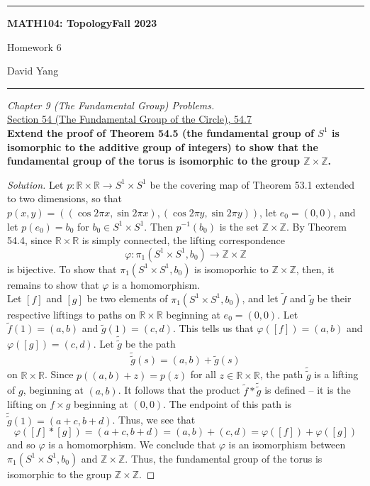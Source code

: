 \documentclass[11pt]{article}
\newcommand{\R}{\mathbb{R}}
\newcommand{\Z}{\mathbb{Z}}
\newenvironment{solution}
  {\renewcommand\qedsymbol{$\blacksquare$}\begin{proof}[Solution]}
  {\end{proof}}
\begin{document}
	\hrule
	\begin{center}
        \textbf{MATH104: Topology}\hfill \textbf{Fall 2023}\newline

		{\Large Homework 6}

		David Yang
	\end{center}

\hrule

\vspace{1em}

\textit{Chapter 9 (The Fundamental Group) Problems.} \\

\underline{Section 54 (The Fundamental Group of the Circle), 54.7} \\

\textbf{Extend the proof of Theorem 54.5 (the fundamental group of $S^1$ is isomorphic to the additive group of integers) to show that the fundamental group of the torus
is isomorphic to the group $\Z \times \Z$.}

\begin{solution}
Let $p\colon \R \times \R \rightarrow S^1 \times S^1$ be the covering map of Theorem 53.1 extended to two dimensions, so that $p(x, y) = (\left( \cos 2\pi x, \sin 2\pi x \right), \left( \cos 2\pi y, \sin 2\pi y \right) )$, 
let $e_0 = (0, 0)$, and let $p(e_0) = b_0$ for $b_0 \in S^1 \times S^1$. Then $p^{-1}(b_0)$ is the set $\Z \times \Z$. By Theorem 54.4, since $\R \times \R$ is simply connected, the lifting correspondence
\[
    \varphi \colon \pi _1(S^1 \times S^1, b_0) \rightarrow \Z \times \Z
\]
is bijective. To show that $ \pi_1(S^1 \times S^1, b_0)$ is isomoporhic to $\Z \times \Z$, then, it remains to show that $\varphi$ is a homomorphism. \\

Let $[f]$ and $[g]$ be two elements of $\pi_1(S^1 \times S^1, b_0)$, and let $\tilde{f}$ and $\tilde{g}$ be their respective liftings to paths on $\R \times \R$ beginning at $e_0 = (0, 0)$. 
Let $\tilde{f}(1) = (a, b)$ and $\tilde{g}(1) = (c, d)$. This tells us that $\varphi([f]) = (a, b)$ and $\varphi([g]) = (c, d)$. Let $\tilde{\tilde{g}}$ be the path
\[
    \tilde{\tilde{g}}(s) = (a, b) + \tilde{g}(s)
\]
on $\R \times \R$. Since $p((a, b) + z) = p(z)$ for all $z \in \R \times \R$, the path $\tilde{\tilde{g}}$ is a lifting of $g$, beginning at $(a, b)$. It follows that the product $\tilde{f} * \tilde{\tilde{g}}$ is defined
-- it is the lifting on $f \times g$ beginning at $(0, 0)$. The endpoint of this path is $\tilde{\tilde{g}}(1) = (a + c, b + d)$. Thus, we see that
\[
    \varphi([f] * [g]) = (a + c, b + d) = (a, b) + (c, d) = \varphi([f]) + \varphi([g])
\]
and so $\varphi$ is a homomorphism. We conclude that $\varphi$ is an isomorphism between $\pi_1(S^1 \times S^1, b_0)$ and $\Z \times \Z$. Thus, the fundamental group of the torus is isomorphic to the group $\Z \times \Z$.
\end{solution}
\newpage
\end{document}
